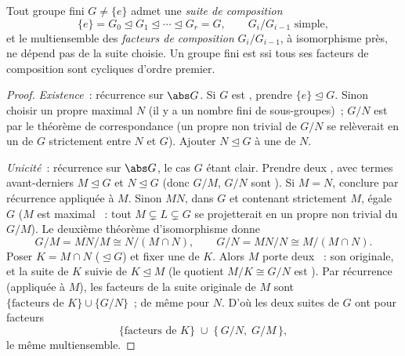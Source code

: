 \begin{theorem}\label{thm:b3:groups:jordanholder}
Tout groupe fini $G \neq \{e\}$ admet une \emph{suite de
composition}
\[
\{e\} = G_0 \trianglelefteq G_1 \trianglelefteq \cdots
\trianglelefteq G_r = G,
\qquad G_{i}/G_{i-1} \text{ simple},
\]
et le multiensemble des \emph{facteurs de composition}
$G_i/G_{i-1}$, à isomorphisme près, ne dépend pas de la suite
choisie. Un groupe fini est  ssi tous ses facteurs de
composition sont cycliques d'ordre premier.
\end{theorem}

\begin{proof}
\emph{Existence}~: récurrence sur $\abs G$. Si $G$ est ,
prendre $\{e\} \trianglelefteq G$. Sinon choisir un  propre maximal $N$ (il y a un nombre fini de sous-groupes)~;
$G/N$ est  par le théorème de correspondance (un  propre non trivial de $G/N$ se relèverait en un  de $G$ strictement entre $N$ et $G$). Ajouter $N
\trianglelefteq G$ à une  de $N$.

\emph{Unicité}~: récurrence sur $\abs G$, le cas $G$  étant
clair. Prendre deux , avec termes
avant-derniers $M \trianglelefteq G$ et $N \trianglelefteq G$
(donc $G/M$, $G/N$ sont ). Si $M = N$, conclure par
récurrence appliquée à $M$. Sinon $MN$,  dans $G$ et
contenant strictement $M$, égale $G$ ($M$ est maximal ~: tout
 $M \subsetneq L \subsetneq G$ se projetterait en un
 propre non trivial du  $G/M$). Le
deuxième théorème d'isomorphisme donne
\[
G/M = MN/M \cong N/(M \cap N),
\qquad
G/N = MN/N \cong M/(M \cap N).
\]
Poser $K = M \cap N$ ($\trianglelefteq G$) et fixer une  de $K$. Alors $M$ porte deux ~:
son originale, et la suite de $K$ suivie de $K \trianglelefteq M$
(le quotient $M/K \cong G/N$ est ). Par récurrence
(appliquée à $M$), les facteurs de la suite originale de $M$ sont
$\{\text{facteurs de } K\} \cup \{G/N\}$~; de même pour $N$.
D'où les deux suites de $G$ ont pour facteurs
\[
\{\text{facteurs de } K\} \;\cup\; \{\,G/N,\; G/M\,\},
\]
le même multiensemble.


\end{proof}
